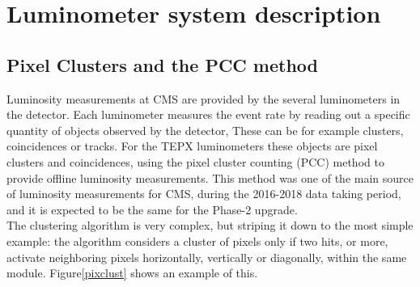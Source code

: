 \chapter{  Luminometer system description}




\section{Pixel Clusters and the PCC method}

Luminosity measurements at CMS are provided by the several luminometers in the detector.
Each luminometer measures the event rate by reading out a specific quantity of objects observed by the detector, These can be for example clusters, coincidences or tracks. For the TEPX luminometers these objects are pixel clusters and coincidences, using the pixel cluster counting (PCC) method to provide offline luminosity measurements. This method was one of the main source of luminosity measurements for CMS, during the 2016-2018 data taking period, and it is expected to be the same for the Phase-2 upgrade.\\
The clustering algorithm is very complex, but striping it down to the most simple example: the algorithm considers a cluster of pixels only if two hits, or more,  activate neighboring pixels horizontally, vertically or diagonally, within the same module. Figure\ref{pixclust} shows an example of this.
